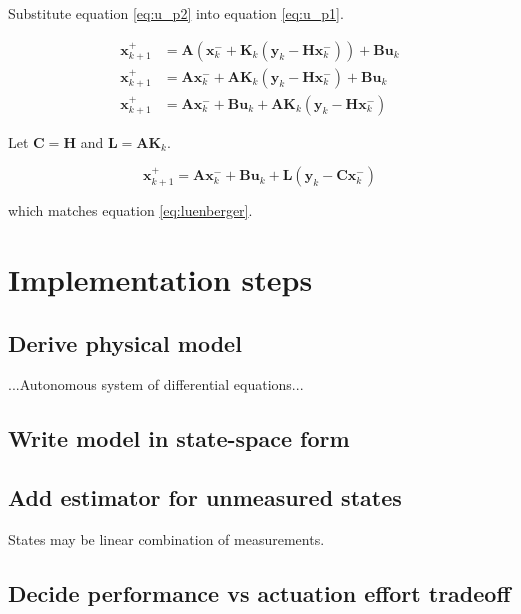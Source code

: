 \documentclass[10pt,conference,compsoc]{IEEEtran}
\newcommand{\mtx}[1] {\bm #1}
\begin{document}
\noindent Substitute equation \ref{eq:u_p2} into equation \ref{eq:u_p1}.

\begin{align*}
  \mtx{x}_{k+1}^+ &= \mtx{A} (\mtx{x}_k^- +
    \mtx{K}_k (\mtx{y}_k - \mtx{H} \mtx{x}_k^-)) + \mtx{B} \mtx{u}_k \\
  \mtx{x}_{k+1}^+ &= \mtx{A} \mtx{x}_k^- +
    \mtx{A} \mtx{K}_k (\mtx{y}_k - \mtx{H} \mtx{x}_k^-) + \mtx{B} \mtx{u}_k \\
  \mtx{x}_{k+1}^+ &= \mtx{A} \mtx{x}_k^- + \mtx{B} \mtx{u}_k +
    \mtx{A} \mtx{K}_k (\mtx{y}_k - \mtx{H} \mtx{x}_k^-)
\end{align*}

\noindent Let $\mtx{C} = \mtx{H}$ and $\mtx{L} = \mtx{A} \mtx{K}_k$.

\begin{equation}
  \mtx{x}_{k+1}^+ = \mtx{A} \mtx{x}_k^- + \mtx{B} \mtx{u}_k +
    \mtx{L} (\mtx{y}_k - \mtx{C} \mtx{x}_k^-) \label{eq:kalman_luenberger}
\end{equation}

\noindent which matches equation \ref{eq:luenberger}.

\section{Implementation steps}

\subsection{Derive physical model}

\noindent ...Autonomous system of differential equations...

\subsection{Write model in state-space form}

\subsection{Add estimator for unmeasured states}

\noindent States may be linear combination of measurements.

\subsection{Decide performance vs actuation effort tradeoff}
\end{document}
